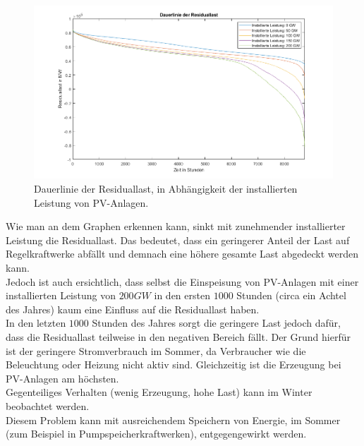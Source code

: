 \documentclass[a4paper,12pt]{article}
\begin{document}
	\begin{figure}[H]
		\centering
		\includegraphics[width=12cm]{img/results/DauerlinieResiduallast}
		\caption{Dauerlinie der Residuallast, in Abhängigkeit der installierten Leistung von PV-Anlagen.}
	\end{figure}
	Wie man an dem Graphen erkennen kann, sinkt mit zunehmender installierter Leistung die Residuallast. Das bedeutet, dass ein geringerer Anteil der Last auf Regelkraftwerke abfällt und demnach eine höhere gesamte Last abgedeckt werden kann.\\ Jedoch ist auch ersichtlich, dass selbst die Einspeisung von PV-Anlagen mit einer installierten Leistung von $200GW$ in den ersten $1000$ Stunden (circa ein Achtel des Jahres) kaum eine Einfluss auf die Residuallast haben.\\
	In den letzten $1000$ Stunden des Jahres sorgt die geringere Last jedoch dafür, dass die Residuallast teilweise in den negativen Bereich fällt. Der Grund hierfür ist der geringere Stromverbrauch im Sommer, da Verbraucher wie die Beleuchtung oder Heizung nicht aktiv sind. Gleichzeitig ist die Erzeugung bei PV-Anlagen am höchsten.\\
	Gegenteiliges Verhalten (wenig Erzeugung, hohe Last) kann im Winter beobachtet werden.\\
	Diesem Problem kann mit ausreichendem Speichern von Energie, im Sommer (zum Beispiel in Pumpspeicherkraftwerken), entgegengewirkt werden.
\end{document}
